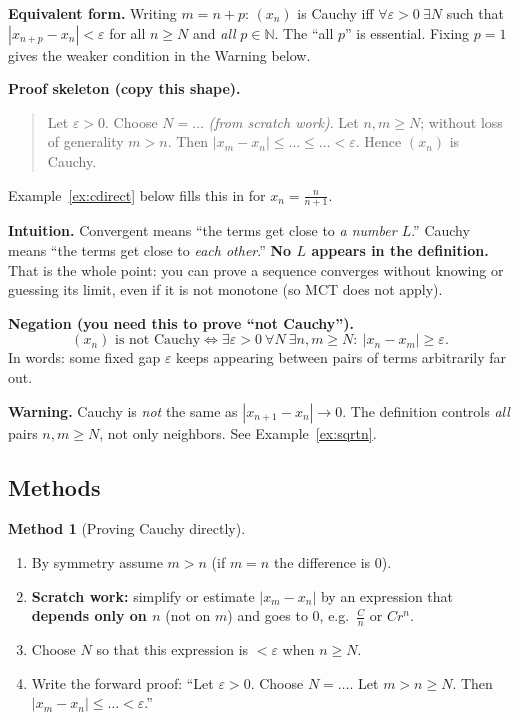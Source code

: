 \documentclass[11pt]{article}
\theoremstyle{definition}
\newtheorem{method}[defn]{Method}
\newcommand{\N}{\mathbb{N}}
\newcommand{\eps}{\varepsilon}
\newcommand{\key}[1]{\textcolor{red!70!black}{\textbf{#1}}}
\begin{document}
\noindent\key{Equivalent form.} Writing $m=n+p$: $(x_n)$ is Cauchy iff
$\forall\eps>0\ \exists N$ such that $|x_{n+p}-x_n|<\eps$ for all
$n\ge N$ and \emph{all} $p\in\N$. The ``all $p$'' is essential. Fixing
$p=1$ gives the weaker condition in the Warning below.

\noindent\key{Proof skeleton (copy this shape).}
\begin{quote}
Let $\eps>0$. Choose $N=\ldots$ \emph{(from scratch work)}. Let
$n,m\ge N$; without loss of generality $m>n$. Then
$|x_m-x_n|\le\ldots\le\ldots<\eps$. Hence $(x_n)$ is Cauchy.
\end{quote}
Example~\ref{ex:cdirect} below fills this in for $x_n=\frac n{n+1}$.

\noindent\key{Intuition.} Convergent means ``the terms get close to
\emph{a number $L$}.'' Cauchy means ``the terms get close to \emph{each
other}.'' \textbf{No $L$ appears in the definition.} That is the whole
point: you can prove a sequence converges without knowing or guessing its
limit, even if it is not monotone (so MCT does not apply).

\medskip
\noindent\key{Negation (you need this to prove ``not Cauchy'').}
\[
(x_n)\text{ is not Cauchy}\iff
\exists\eps>0\ \forall N\ \exists n,m\ge N:\ |x_n-x_m|\ge\eps.
\]
In words: some fixed gap $\eps$ keeps appearing between pairs of terms
arbitrarily far out.

\medskip
\noindent\key{Warning.} Cauchy is \emph{not} the same as
$|x_{n+1}-x_n|\to0$. The definition controls \emph{all} pairs $n,m\ge N$,
not only neighbors. See Example~\ref{ex:sqrtn}.

\subsection{Methods}

\begin{method}[Proving Cauchy directly]\label{meth:cauchy}
\leavevmode
\begin{enumerate}[nosep]
  \item By symmetry assume $m>n$ (if $m=n$ the difference is $0$).
  \item \textbf{Scratch work:} simplify or estimate $|x_m-x_n|$ by an
        expression that \key{depends only on $n$} (not on $m$) and goes to
        $0$, e.g.\ $\frac Cn$ or $Cr^n$.
  \item Choose $N$ so that this expression is $<\eps$ when $n\ge N$.
  \item Write the forward proof: ``Let $\eps>0$. Choose $N=\ldots$. Let
        $m>n\ge N$. Then $|x_m-x_n|\le\ldots<\eps$.''
\end{enumerate}
\end{method}
\end{document}
